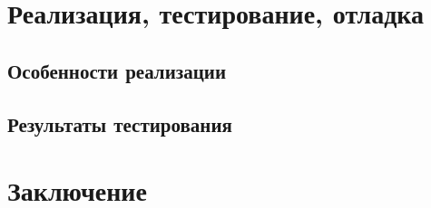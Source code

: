   \section{Реализация, тестирование, отладка}

    \subsection{Особенности реализации}

    \subsection{Результаты тестирования}

  \section*{Заключение}

  \nocite{*}
  




